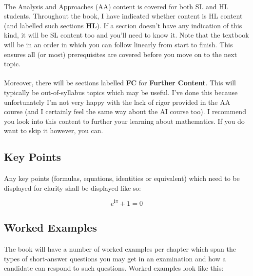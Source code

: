 \documentclass[12pt, a4paper, titlepage, twoside]{article}
\newcommand*{\im}{\mathbold{i}}
\begin{document}
	\paragraph{}
	The Analysis and Approaches (AA) content is covered for both SL and HL students. Throughout the book,
	I have indicated whether content is HL content (and labelled such sections \textbf{HL}). If a section doesn't have
	any indication of this kind, it will be SL content too and you'll need to know it. 
	Note that the textbook will be in an order in which you can follow linearly from start to finish. This ensures all (or most) prerequisites are 
	covered before you move on to the next topic.
	
	\paragraph{}
	Moreover, there will be sections labelled \textbf{FC} for \textbf{Further Content}. This will typically be out-of-syllabus topics which may
	be useful. I've done this because unfortunately I'm not very happy with the lack of rigor provided in the AA course (and I certainly feel the 
	same way about the AI course too). I recommend you look into this content to further your learning about mathematics. If you do want to
	skip it however, you can.

	\subsection*{Key Points}
	
	\paragraph{}
	Any key points (formulas, equations, identities or equivalent) which need to be displayed for clarity shall be displayed like so:\\
	
	\begin{kp}
		$$e^{\im \pi} + 1 = 0$$
	\end{kp}

	\subsection*{Worked Examples}

	\paragraph{}
	The book will have a number of worked examples per chapter which span the types of short-answer questions you may get in an 
	examination and how a candidate can respond to such questions. Worked examples look like this:\\
	
\end{document}
